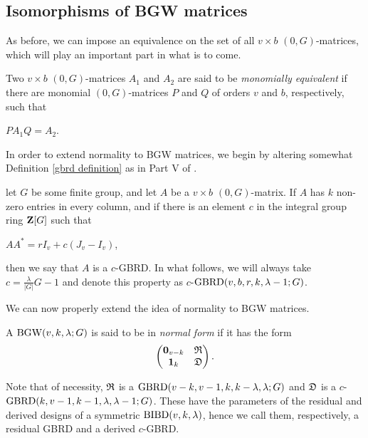 \documentclass[../../../main]{subfiles}
\begin{document}
\dinkus


\subsection{Isomorphisms of BGW matrices}

As before, we can impose an equivalence on the set of all $v \times b$ $(0,G)$-matrices, which will play an important part in what is to come. 

\begin{defin}\label{monomial-equiv}
  Two $v \times b$ $(0,G)$-matrices $A_1$ and $A_2$ are said to be {\it
    monomially equivalent} if there are monomial $(0,G)$-matrices $P$ and $Q$ of
  orders $v$ and $b$, respectively, such that  
  \begin{defenum}
  \item $PA_1Q=A_2$.
  \end{defenum}
\end{defin}

 In order to extend normality to BGW matrices, we begin by altering somewhat Definition \ref{gbrd definition} as in Part V of \cite{handbook}.
 
 \begin{defin}\label{c-gbrd defintion}
   let $G$ be some finite group, and let $A$ be a $v \times b$ $(0,G)$-matrix.
   If $A$ has $k$ non-zero entries in every column, and if there is an element
   $c$ in the integral group ring $\mathbf{Z}[G]$ such that 
  \begin{defenum}
   \item\label{c-gbrd-eq} $AA^* = rI_v + c(J_v - I_v)$,
  \end{defenum}
  then we say that $A$ is a $c$-GBRD. In what follows, we will always take $c
  = \frac{\lambda}{|G|}G - 1$ and denote this property as
  $c$-$\text{GBRD}(v,b,r,k,\lambda-1;G)$. 
 \end{defin}
 
 We can now properly extend the idea of normality to BGW matrices.
 
 \begin{defin}
   A $\text{BGW}(v,k,\lambda;G)$ is said to be in {\it normal form} if it has the form
   \begin{equation}
     \begin{pmatrix}
       \mathbf{0}_{v-k} & \mathfrak{R} \\ \mathbf{1}_{k} & \mathfrak{D}
     \end{pmatrix}.
   \end{equation}
   
   Note that of necessity, $\mathfrak{R}$ is a $\text{GBRD}(v-k,v-1,k,k-\lambda,\lambda;G)$
   and $\mathfrak{D}$ is a $c$-$\text{GBRD}(k,v-1,k-1,\lambda,\lambda-1;G)$. These have the
   parameters of the residual and derived designs of a symmetric
   $\text{BIBD}(v,k,\lambda)$, hence we call them, respectively, a residual GBRD and a
   derived $c$-GBRD. 
 \end{defin}
\end{document}
